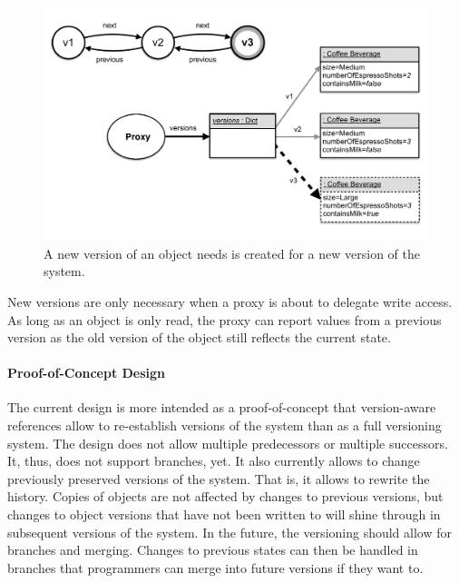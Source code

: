 \begin{figure}[h]
    \centering
    \includegraphics[width=\textwidth]{figures/4_approach/10_newVersionOfAnObject.pdf}
    \caption{A new version of an object needs is created for a new version of the system.}
    \label{fig:NewVersion}
\end{figure}

New versions are only necessary when a proxy is about to delegate write access.
As long as an object is only read, the proxy can report values from a previous version as the old version of the object still reflects the current state.

\paragraph{Proof-of-Concept Design}
The current design is more intended as a proof-of-concept that version-aware references allow to re-establish versions of the system than as a full versioning system.
The design does not allow multiple predecessors or multiple successors.
It, thus, does not support branches, yet.
It also currently allows to change previously preserved versions of the system.
That is, it allows to rewrite the history.
Copies of objects are not affected by changes to previous versions, but changes to object versions that have not been written to will shine through in subsequent versions of the system.
In the future, the versioning should allow for branches and merging.
Changes to previous states can then be handled in branches that programmers can merge into future versions if they want to.




